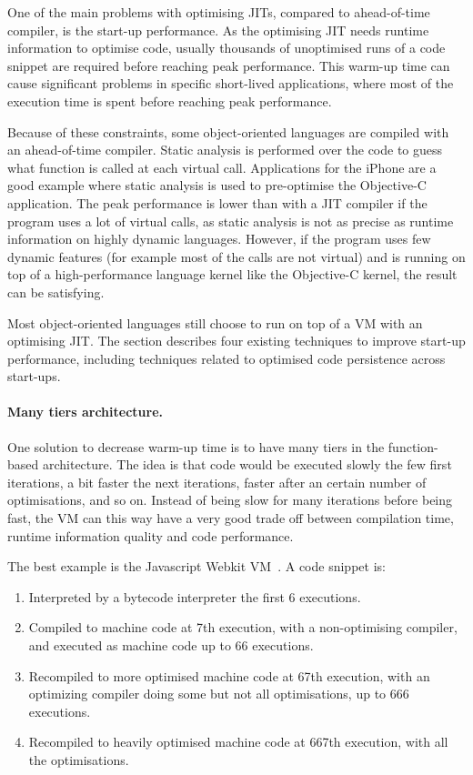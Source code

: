 \documentclass[a4paper,12pt,twoside]{../includes/ThesisStyle}
\begin{document}
One of the main problems with optimising JITs, compared to ahead-of-time compiler, is the start-up performance. As the optimising JIT needs runtime information to optimise code, usually thousands of unoptimised runs of a code snippet are required before reaching peak performance. This warm-up time can cause significant problems in specific short-lived applications, where most of the execution time is spent before reaching peak performance. 

Because of these constraints, some object-oriented languages are compiled with an ahead-of-time compiler. Static analysis is performed over the code to guess what function is called at each virtual call. Applications for the iPhone are a good example where static analysis is used to pre-optimise the Objective-C application. The peak performance is lower than with a JIT compiler if the program uses a lot of virtual calls, as static analysis is not as precise as runtime information on highly dynamic languages. However, if the program uses few dynamic features (for example most of the calls are not virtual) and is running on top of a high-performance language kernel like the Objective-C kernel, the result can be satisfying.

Most object-oriented languages still choose to run on top of a VM with an optimising JIT. The section describes four existing techniques to improve start-up performance, including techniques related to optimised code persistence across start-ups.

\paragraph{Many tiers architecture.}
One solution to decrease warm-up time is to have many tiers in the function-based architecture. The idea is that code would be executed slowly the few first iterations, a bit faster the next iterations, faster after an certain number of optimisations, and so on. Instead of being slow for many iterations before being fast, the VM can this way have a very good trade off between compilation time, runtime information quality and code performance.

The best example is the Javascript Webkit VM~\cite{Webkit15}. A code snippet is:
\begin{enumerate}
\item Interpreted by a bytecode interpreter the first 6 executions.
\item Compiled to machine code at 7th execution, with a non-optimising compiler, and executed as machine code up to 66 executions.
\item Recompiled to more optimised machine code at 67th execution, with an optimizing compiler doing some but not all optimisations, up to 666 executions.
\item Recompiled to heavily optimised machine code at 667th execution, with all the optimisations.
\end{enumerate}
\end{document}
